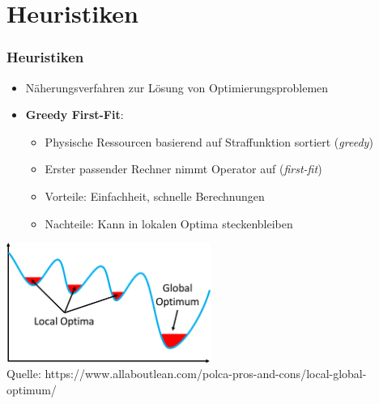 \documentclass{beamer}
\begin{document}
\section{Heuristiken}
\begin{frame}
\frametitle{Heuristiken}
\begin{itemize}
    \item Näherungsverfahren zur Lösung von Optimierungsproblemen
    \item \textbf{Greedy First-Fit}: 
    \begin{itemize}
        \item Physische Ressourcen basierend auf Straffunktion sortiert (\textit{greedy})
        \item Erster passender Rechner nimmt Operator auf (\textit{first-fit})
        \item Vorteile: Einfachheit, schnelle Berechnungen
        \item Nachteile: Kann in lokalen Optima steckenbleiben
    \end{itemize}
\end{itemize}
\begin{center}
    \includegraphics[width=0.5\textwidth]{res/Local-Global-Optimum.png} \\
    \tiny \color{gray} Quelle: https://www.allaboutlean.com/polca-pros-and-cons/local-global-optimum/
\end{center}
\end{frame}
\end{document}
